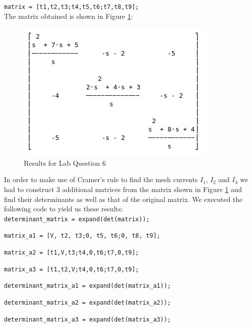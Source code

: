 \documentclass[12pt, a4paper]{article}
\begin{document}
	\texttt{matrix = [t1,t2,t3;t4,t5,t6;t7,t8,t9];}\\

	The matrix obtained is shown in Figure \ref{fig:question_6}:\\
	
	\begin{figure}[H]
		\centering
		\includegraphics[width=\textwidth]{question_6}
		\caption{Results for Lab Question 6}
		\label{fig:question_6}
	\end{figure}

	In order to make use of Cramer's  rule to find the mesh currents $I_1$, $I_2$ and $I_3$ we had to construct 3 additional matrices from the matrix shown in Figure \ref{fig:question_6} and find their determinants as well as that of the original matrix. We executed the following code to yield us these results:\\

	\texttt{determinant\_matrix = expand(det(matrix));}\par

	
  	\texttt{matrix\_a1 = [V, t2, t3;0, t5, t6;0, t8, t9];}\par
  	\texttt{matrix\_a2 = [t1,V,t3;t4,0,t6;t7,0,t9];}\par
  	\texttt{matrix\_a3 = [t1,t2,V;t4,0,t6;t7,0,t9];}\par

  	\texttt{determinant\_matrix\_a1 = expand(det(matrix\_a1));}\par
  	\texttt{determinant\_matrix\_a2 = expand(det(matrix\_a2));}\par
  	\texttt{determinant\_matrix\_a3 = expand(det(matrix\_a3));}\par
\end{document}
